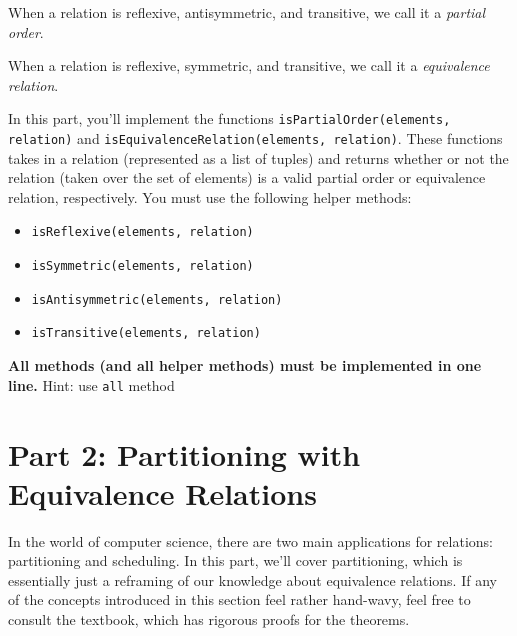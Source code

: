 \documentclass{article}
\begin{document}
When a relation is reflexive, antisymmetric, and transitive, we call it a \textit{partial order}.

When a relation is reflexive, symmetric, and transitive, we call it a \textit{equivalence relation}.





    \vspace{3mm}
    \begin{tcolorbox}[colback=yellow!30]
        In this part, you'll implement the functions \lstinline{isPartialOrder(elements, relation)} and \lstinline{isEquivalenceRelation(elements, relation)}. These functions takes in a relation (represented as a list of tuples) and returns whether or not the relation (taken over the set of elements) is a valid partial order or equivalence relation, respectively. You must use the following helper methods:
        \begin{itemize}
            \item \lstinline{isReflexive(elements, relation)}
            \item \lstinline{isSymmetric(elements, relation)}
            \item \lstinline{isAntisymmetric(elements, relation)}
            \item \lstinline{isTransitive(elements, relation)}
        \end{itemize}
        \textbf{All methods (and all helper methods) must be implemented in one line.}
        Hint: use \lstinline{all} method
    \end{tcolorbox}



\section*{Part 2: Partitioning with Equivalence Relations}
    In the world of computer science, there are two main applications for relations: partitioning and scheduling. In this part, we'll cover partitioning, which is essentially just a reframing of our knowledge about equivalence relations. If any of the concepts introduced in this section feel rather hand-wavy, feel free to consult the textbook, which has rigorous proofs for the theorems.
\end{document}
